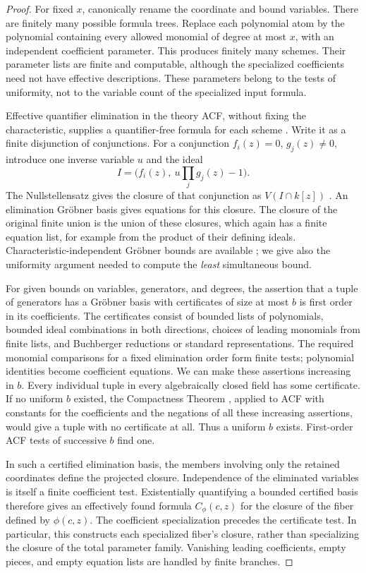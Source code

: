 \begin{proof}
For fixed $x$, canonically rename the coordinate and bound variables.  There
are finitely many possible formula trees.  Replace each polynomial atom by
the polynomial containing every allowed monomial of degree at most $x$, with
an independent coefficient parameter.  This produces finitely many schemes.
Their parameter lists are finite and computable, although the specialized
coefficients need not have effective descriptions.  These parameters belong
to the tests of uniformity, not to the variable count of the specialized
input formula.

Effective quantifier elimination in the theory ACF, without fixing the
characteristic, supplies a quantifier-free formula for each scheme
\cite{CohenMahboubi2012}.  Write it as a finite disjunction of conjunctions.
For a conjunction $f_i(z)=0$, $g_j(z)\ne0$, introduce one inverse variable $u$
and the ideal
\[
 I=\bigl(f_i(z),\ u\textstyle\prod_jg_j(z)-1\bigr).
\]
The Nullstellensatz gives the closure of that conjunction as $V(I\cap k[z])$ \citep[Theorem~10.34.1]{StacksNullstellensatz}.  An elimination
Gr\"obner basis gives equations for this closure.  The closure of the original
finite union is the union of these closures, which again has a finite
equation list, for example from the product of their defining ideals.
Characteristic-independent Gr\"obner bounds are available
\cite{Dube1990}; we give also the uniformity argument needed to compute the
\emph{least} simultaneous bound.

For given bounds on variables, generators, and degrees, the assertion that a
tuple of generators has a Gr\"obner basis with certificates of size at most
$b$ is first order in its coefficients.  The certificates consist of bounded
lists of polynomials, bounded ideal combinations in both directions, choices
of leading monomials from finite lists, and Buchberger reductions or standard
representations.  The required monomial comparisons for a fixed elimination
order form finite tests; polynomial identities become coefficient equations.
We can make these assertions increasing in $b$.  Every individual tuple in
every algebraically closed field has some certificate.  If no uniform $b$
existed, the Compactness Theorem \citep[p.~26]{Marker2020}, applied to ACF with constants for the coefficients and
the negations of all these increasing assertions, would give a tuple with no
certificate at all.  Thus a uniform $b$ exists.  First-order ACF tests of
successive $b$ find one.

In such a certified elimination basis, the members involving only the
retained coordinates define the projected closure.  Independence of the
eliminated variables is itself a finite coefficient test.  Existentially
quantifying a bounded certified basis therefore gives an effectively found
formula $C_\phi(c,z)$ for the closure of the fiber defined by $\phi(c,z)$.
The coefficient specialization precedes the certificate test.  In
particular, this constructs each specialized fiber's closure, rather than
specializing the closure of the total parameter family.  Vanishing leading
coefficients, empty pieces, and empty equation lists are handled by finite
branches.


\end{proof}
